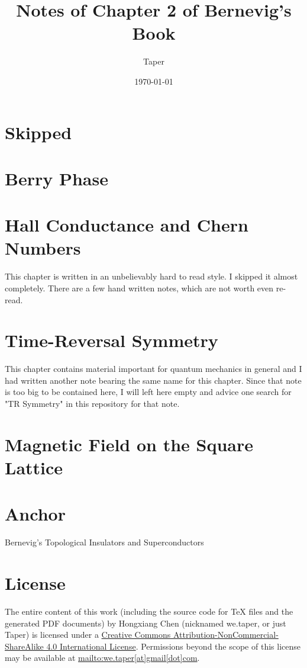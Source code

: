 \documentclass{article}
\title{Notes of Chapter 2 of Bernevig's Book}
\date{\today}
\author{Taper}
\numberwithin{equation}{subsection} %
\theoremstyle{definition}
\begin{document}
\maketitle
{}
\tableofcontents

\section{Skipped}

\section{Berry Phase}


\section{Hall Conductance and Chern Numbers}

This chapter is written in an unbelievably hard to read style. I
skipped it almost completely. There are a few hand written notes,
which are not worth even re-read.

\section{Time-Reversal Symmetry}

This chapter contains material important for quantum mechanics in
general and I had written another note bearing the same name for this
chapter. Since that note is too big to be contained here, I will left
here empty and advice one search for "TR Symmetry" in this
repository for that note.

\section{Magnetic Field on the Square Lattice}

\section{Anchor}
\label{sec:Anchor}

\begin{thebibliography}{1}
     Bernevig's Topological Insulators and
    Superconductors
\end{thebibliography}
\printnomenclature
\section{License}
The entire content of this work (including the source code
for TeX files and the generated PDF documents) by 
Hongxiang Chen (nicknamed we.taper, or just Taper) is
licensed under a 
\href{http://creativecommons.org/licenses/by-nc-sa/4.0/}{Creative 
Commons Attribution-NonCommercial-ShareAlike 4.0 International 
License}. Permissions beyond the scope of this 
license may be available at \url{mailto:we.taper[at]gmail[dot]com}.
\end{document}
